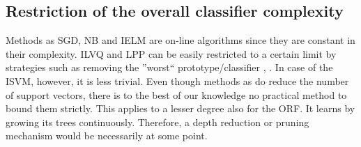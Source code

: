\documentclass{esann}
\begin{document}
\subsection{Restriction of the overall classifier complexity}\label{modelComplexity}
Methods as SGD, NB and IELM are on-line algorithms since they are constant in their complexity. ILVQ and LPP can be easily restricted to a certain limit 
by strategies such as removing the ''worst`` prototype/classifier \cite{grbovic2009learning}, \cite{elwell2009incremental}. In case of the ISVM, however, it is less trivial. Even though methods as \cite{Downs:2002:ESS:944790.944814} do reduce the number of support vectors, 
there is to the best of our knowledge no practical method to bound them strictly. This applies to a lesser degree also for the ORF. It learns by growing its trees continuously. Therefore, a depth reduction or pruning mechanism would be necessarily at some point.\\
\end{document}
